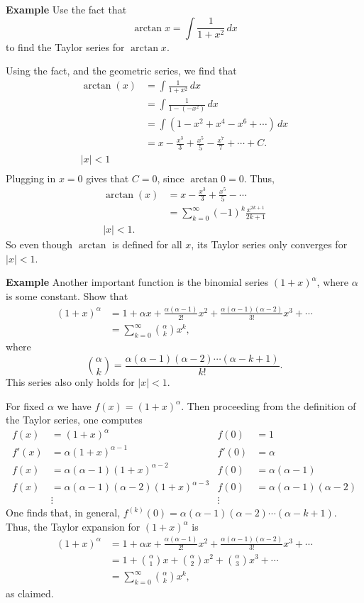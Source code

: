 \documentclass[twoside,openright,titlepage,a4paper]{book}
\begin{document}
\begin{sloppypar}
\textbf{Example} Use the fact that \[\arctan x = \int \frac{1}{1+x^2}\, dx\] to find the Taylor series for $\arctan x$. 
\begin{examplebox}
Using the fact, and the geometric series, we find that
\begin{align*}
\arctan(x) &= \int \frac{1}{1+x^2} \, dx \\
&= \int \frac{1}{1-\left(-x^2\right)} \, dx \\ 
&= \int \left(1-x^2+x^4-x^6+\dotsb \right) \, dx \\
&= x - \frac{x^3}{3} + \frac{x^5}{5} - \frac{x^7}{7} + \dotsb + C. \\
|x|<1 \\
\end{align*}
Plugging in $x=0$ gives that $C = 0$, since $\arctan 0 = 0$. Thus,
\begin{align*}
\arctan(x) &= x - \frac{x^3}{3}+\frac{x^5}{5}-\dotsb \\
&= \sum_{k=0}^\infty (-1)^k \frac{x^{2k+1}}{2k+1} \\
|x|<1. 
\end{align*}
So even though $\arctan$ is defined for all $x$, its Taylor series only converges for $|x|<1$.
\end{examplebox}

\textbf{Example} Another important function is the binomial series $(1+x)^\alpha$, where $\alpha$ is some constant. Show that
\begin{align*} 
(1+x)^\alpha &= 1 + \alpha x + \frac{\alpha (\alpha - 1)}{2!} x^2 + \frac{\alpha(\alpha-1)(\alpha-2)}{3!} x^3 + \dotsb \\
&= \sum_{k=0}^\infty {\alpha \choose k} x^k, 
\end{align*}
where \[ {\alpha \choose k} = \frac{\alpha (\alpha-1) (\alpha -2) \dotsb (\alpha - k + 1)}{k!}. \] This series also only holds for $|x|<1$.
\begin{examplebox}
For fixed $\alpha$ we have $f(x) = (1+x)^\alpha$. Then proceeding from the definition of the Taylor series, one computes
\begin{align*} 
f(x) &= (1+x)^\alpha & f(0) &= 1 \\
f'(x) &= \alpha(1+x)^{\alpha-1} & f'(0) &= \alpha \\
f(x) &= \alpha(\alpha-1)(1+x)^{\alpha-2} & f(0) &= \alpha(\alpha-1) \\
f(x) &= \alpha(\alpha-1)(\alpha-2)(1+x)^{\alpha-3} & f(0) &= \alpha(\alpha-1)(\alpha-2) \\
& \vdots & \vdots 
\end{align*}
One finds that, in general, $f^{\left(k\right)}(0) = \alpha(\alpha-1)(\alpha-2)\dotsb (\alpha-k+1)$. Thus, the Taylor expansion for $(1+x)^\alpha$ is
\begin{align*}
(1+x)^\alpha &= 1 + \alpha x + \frac{\alpha(\alpha-1)}{2!}x^2 + \frac{\alpha(\alpha-1)(\alpha-2)}{3!}x^3 + \dotsb \\
&= 1 + \binom{\alpha}{1}x + \binom{\alpha}{2}x^2 + \binom{\alpha}{3}x^3 + \dotsb \\
&= \sum_{k=0}^\infty \binom{\alpha}{k} x^k, 
\end{align*}
as claimed.
\end{examplebox}


\end{sloppypar}
\end{document}
